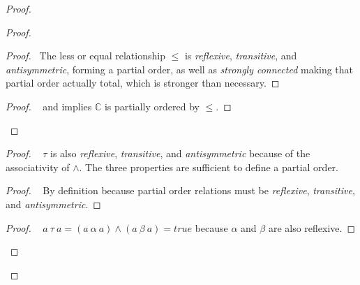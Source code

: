 \documentclass[11pt, oneside]{article}   	%
\begin{document}
\begin{proof}
\begin{proof}
			\begin{proof}
				\pf~The less or equal relationship $\leq$ is \textit{reflexive}, \textit{transitive}, and \textit{antisymmetric}, forming a partial order, as well as \textit{strongly connected} making that partial order actually total, which is stronger than necessary.
			\end{proof}

			\qedstep
			\begin{proof}
				\pf~ and  implies $\mathds{C}$ is partially ordered by $\leq$.
			\end{proof}
		\end{proof}
		
		\begin{proof}
			\pfsketch~ $\tau$ is also \textit{reflexive}, \textit{transitive}, and \textit{antisymmetric} because of the associativity of $\wedge$. The three properties are sufficient to define a partial order.
			\begin{proof}
				\pf~ By definition because partial order relations must be \textit{reflexive}, \textit{transitive}, and \textit{antisymmetric}.
			\end{proof}
	
			\begin{proof}
				\pf~ $a ~\tau~ a = (a ~\alpha~ a) \wedge (a ~\beta~ a) = true$ because  $\alpha$ and $\beta$ are also reflexive.
			\end{proof}
			

\end{proof}
\end{proof}
\end{document}
